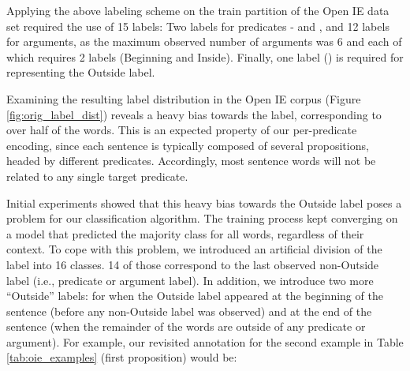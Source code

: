 

Applying the above labeling scheme on the train partition of the Open IE data set required the use
of 15 labels:
Two labels for predicates -  and , and 12 labels for arguments, as the maximum observed number of arguments was 6 and each of which requires 2 labels (Beginning and Inside). Finally, one label () is required for representing the Outside label.

Examining the resulting label distribution in the Open IE corpus (Figure \ref{fig:orig_label_dist})
reveals a heavy bias towards the  label, corresponding to over half of the words.
This is an expected property of our per-predicate encoding, since each sentence is typically composed of several propositions, headed by different predicates. Accordingly, most sentence words will not be related to any single target predicate. 

Initial experiments showed that this heavy bias towards the Outside label poses a problem for our classification algorithm.
The training process kept converging on a model that predicted the majority class for all words, regardless of their context.
To cope with this problem, we introduced an artificial division of the 
label into 16 classes. 14 of those correspond to the last observed non-Outside label (i.e., predicate or argument label).
In addition, we introduce two more ``Outside'' labels:  for when the Outside label appeared at the beginning of the sentence (before any non-Outside label was observed)
and  at the end of the sentence (when the remainder of the words are outside of any predicate or argument).
For example, our revisited annotation for the second example in Table \ref{tab:oie_examples} (first proposition) would be:


